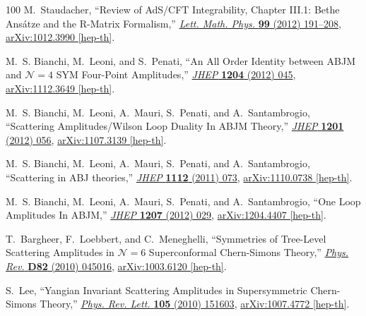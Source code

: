 \documentclass[12pt,hyperref,compress]{JHEP3}
\begin{document}
\begin{thebibliography}{100}
M.~Staudacher, ``{Review of AdS/CFT Integrability, Chapter III.1: Bethe
  Ans\'atze and the R-Matrix Formalism},''
  \href{http://dx.doi.org/10.1007/s11005-011-0530-9}{{\em Lett. Math. Phys.}
  {\bf 99} (2012)  191--208},
\href{http://arxiv.org/abs/1012.3990}{{ arXiv:1012.3990 [hep-th]}}.

M.~S. Bianchi, M.~Leoni, and S.~Penati, ``{An All Order Identity between ABJM
  and $\mathcal{N}\!=\!4$ SYM Four-Point Amplitudes},''
  \href{http://dx.doi.org/10.1007/JHEP04(2012)045}{{\em JHEP} {\bf 1204} (2012)
   045},
\href{http://arxiv.org/abs/1112.3649}{{ arXiv:1112.3649 [hep-th]}}.

M.~S. Bianchi, M.~Leoni, A.~Mauri, S.~Penati, and A.~Santambrogio,
  ``{Scattering Amplitudes/Wilson Loop Duality In ABJM Theory},''
  \href{http://dx.doi.org/10.1007/JHEP01(2012)056}{{\em JHEP} {\bf 1201} (2012)
   056},
\href{http://arxiv.org/abs/1107.3139}{{ arXiv:1107.3139 [hep-th]}}.

M.~S. Bianchi, M.~Leoni, A.~Mauri, S.~Penati, and A.~Santambrogio,
  ``{Scattering in ABJ theories},''
  \href{http://dx.doi.org/10.1007/JHEP12(2011)073}{{\em JHEP} {\bf 1112} (2011)
   073},
\href{http://arxiv.org/abs/1110.0738}{{ arXiv:1110.0738 [hep-th]}}.

M.~S. Bianchi, M.~Leoni, A.~Mauri, S.~Penati, and A.~Santambrogio, ``{One Loop
  Amplitudes In ABJM},'' \href{http://dx.doi.org/10.1007/JHEP07(2012)029}{{\em
  JHEP} {\bf 1207} (2012)  029},
\href{http://arxiv.org/abs/1204.4407}{{ arXiv:1204.4407 [hep-th]}}.

T.~Bargheer, F.~Loebbert, and C.~Meneghelli, ``{Symmetries of Tree-Level
  Scattering Amplitudes in $\mathcal{N}\!=\!6$ Superconformal Chern-Simons
  Theory},'' \href{http://dx.doi.org/10.1103/PhysRevD.82.045016}{{\em Phys.
  Rev.} {\bf D82} (2010)  045016},
\href{http://arxiv.org/abs/1003.6120}{{ arXiv:1003.6120 [hep-th]}}.

S.~Lee, ``{Yangian Invariant Scattering Amplitudes in Supersymmetric
  Chern-Simons Theory},''
  \href{http://dx.doi.org/10.1103/PhysRevLett.105.151603}{{\em Phys. Rev.
  Lett.} {\bf 105} (2010)  151603},
\href{http://arxiv.org/abs/1007.4772}{{ arXiv:1007.4772 [hep-th]}}.


\end{thebibliography}
\end{document}
